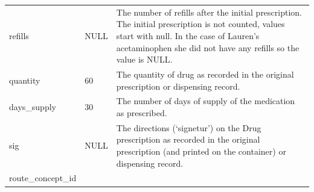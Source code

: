 \documentclass[]{book}
\begin{document}
\begin{longtable}[]{@{}lll@{}}
\begin{minipage}[t]{0.30\columnwidth}
refills\strut
\end{minipage} & \begin{minipage}[t]{0.14\columnwidth}\raggedright\strut
NULL\strut
\end{minipage} & \begin{minipage}[t]{0.47\columnwidth}\raggedright\strut
The number of refills after the initial prescription. The initial
prescription is not counted, values start with null. In the case of
Lauren's acetaminophen she did not have any refills so the value is
NULL.\strut
\end{minipage}\tabularnewline
\begin{minipage}[t]{0.30\columnwidth}\raggedright\strut
quantity\strut
\end{minipage} & \begin{minipage}[t]{0.14\columnwidth}\raggedright\strut
60\strut
\end{minipage} & \begin{minipage}[t]{0.47\columnwidth}\raggedright\strut
The quantity of drug as recorded in the original prescription or
dispensing record.\strut
\end{minipage}\tabularnewline
\begin{minipage}[t]{0.30\columnwidth}\raggedright\strut
days\_supply\strut
\end{minipage} & \begin{minipage}[t]{0.14\columnwidth}\raggedright\strut
30\strut
\end{minipage} & \begin{minipage}[t]{0.47\columnwidth}\raggedright\strut
The number of days of supply of the medication as prescribed.\strut
\end{minipage}\tabularnewline
\begin{minipage}[t]{0.30\columnwidth}\raggedright\strut
sig\strut
\end{minipage} & \begin{minipage}[t]{0.14\columnwidth}\raggedright\strut
NULL\strut
\end{minipage} & \begin{minipage}[t]{0.47\columnwidth}\raggedright\strut
The directions (`signetur') on the Drug prescription as recorded in the
original prescription (and printed on the container) or dispensing
record.\strut
\end{minipage}\tabularnewline
\begin{minipage}[t]{0.30\columnwidth}\raggedright\strut
route\_concept\_id\strut
\end{minipage} & \begin{minipage}[t]{0.14\columnwidth}\raggedright\strut

\end{minipage}
\end{longtable}
\end{document}
